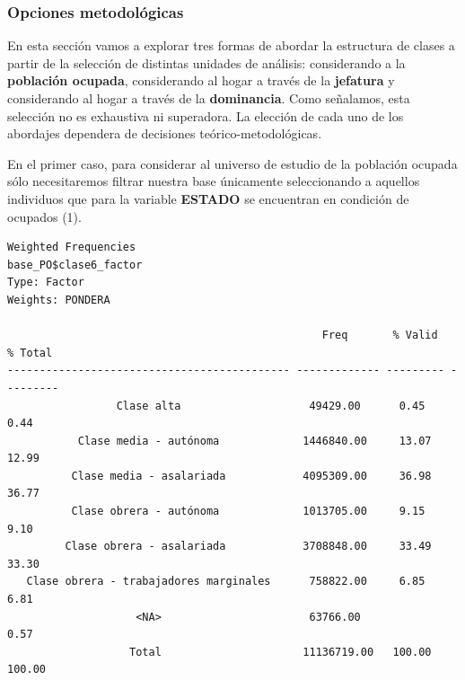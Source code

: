 \documentclass[
]{article}
\newenvironment{Shaded}{\begin{snugshade}}{\end{snugshade}}
\newcommand{\AttributeTok}[1]{\textcolor[rgb]{0.13,0.29,0.53}{#1}}
\newcommand{\CommentTok}[1]{\textcolor[rgb]{0.56,0.35,0.01}{\textit{#1}}}
\newcommand{\ConstantTok}[1]{\textcolor[rgb]{0.56,0.35,0.01}{#1}}
\newcommand{\DecValTok}[1]{\textcolor[rgb]{0.00,0.00,0.81}{#1}}
\newcommand{\FunctionTok}[1]{\textcolor[rgb]{0.13,0.29,0.53}{\textbf{#1}}}
\newcommand{\NormalTok}[1]{#1}
\newcommand{\OtherTok}[1]{\textcolor[rgb]{0.56,0.35,0.01}{#1}}
\newcommand{\SpecialCharTok}[1]{\textcolor[rgb]{0.81,0.36,0.00}{\textbf{#1}}}
\newcommand{\StringTok}[1]{\textcolor[rgb]{0.31,0.60,0.02}{#1}}
\begin{document}
\hypertarget{opciones-metodoluxf3gicas}{%
\subsubsection{Opciones metodológicas}\label{opciones-metodoluxf3gicas}}

En esta sección vamos a explorar tres formas de abordar la estructura de clases a partir de la selección de distintas unidades de análisis: considerando a la \textbf{población ocupada}, considerando al hogar a través de la \textbf{jefatura} y considerando al hogar a través de la \textbf{dominancia}. Como señalamos, esta selección no es exhaustiva ni superadora. La elección de cada uno de los abordajes dependera de decisiones teórico-metodológicas.

En el primer caso, para considerar al universo de estudio de la población ocupada sólo necesitaremos filtrar nuestra base únicamente seleccionando a aquellos individuos que para la variable \textbf{ESTADO} se encuentran en condición de ocupados (1).

\begin{Shaded}
\end{Shaded}

\begin{verbatim}
Weighted Frequencies  
base_PO$clase6_factor  
Type: Factor  
Weights: PONDERA  

                                                 Freq       % Valid   % Total 
-------------------------------------------- ------------- --------- ---------
                 Clase alta                    49429.00      0.45      0.44   
           Clase media - autónoma             1446840.00     13.07     12.99  
          Clase media - asalariada            4095309.00     36.98     36.77  
          Clase obrera - autónoma             1013705.00     9.15      9.10   
         Clase obrera - asalariada            3708848.00     33.49     33.30  
   Clase obrera - trabajadores marginales      758822.00     6.85      6.81   
                    <NA>                       63766.00                0.57   
                   Total                      11136719.00   100.00    100.00  
\end{verbatim}
\end{document}
